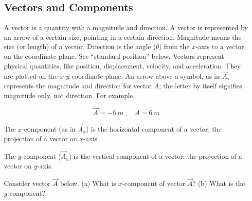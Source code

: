 \documentclass[main-physics.tex]{subfiles}
\begin{document}
\subsection{Vectors and Components}

A vector is a quantity with a magnitude and direction. A vector is represented by an arrow of a certain size, pointing in a certain direction. Magnitude means the size (or length) of a vector. Direction is the angle ($\theta$) from the $x$-axis to a vector on the coordinate plane. See ``standard position'' below. Vectors represent physical quantities, like position, displacement, velocity, and acceleration. They are plotted on the $x$-$y$ coordinate plane. An arrow above a symbol, as in $\vec{A}$, represents the magnitude and direction for vector $A$; the letter by itself signifies magnitude only, not direction. For example,

\begin{equation*}
    \vec{A} = \SI{-6}{m}\ , \hspace{1em} A = \SI{6}{m}
\end{equation*}


The $x$-component (as in  $\vec{A}_x$) is the horizontal component of a vector; the projection of a vector on $x$-axis.


The $y$-component ($\vec{A}_y$) is the vertical component of a vector; the projection of a vector on $y$-axis.

\begin{example}
Consider vector $\vec{A}$ below. (a) What is $x$-component of vector $\vec{A}$? (b) What is the $y$-component?
\end{example}
\end{document}
